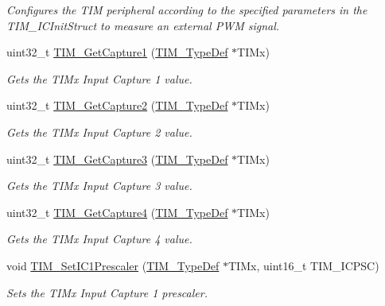 \begin{DoxyCompactItemize}
\begin{DoxyCompactList}\small\item\em Configures the T\+IM peripheral according to the specified parameters in the T\+I\+M\+\_\+\+I\+C\+Init\+Struct to measure an external P\+WM signal. \end{DoxyCompactList}\item 
uint32\+\_\+t \hyperlink{group___t_i_m_ga6bd39ca543305ff0cd06fce0f678d94d}{T\+I\+M\+\_\+\+Get\+Capture1} (\hyperlink{struct_t_i_m___type_def}{T\+I\+M\+\_\+\+Type\+Def} $\ast$T\+I\+Mx)
\begin{DoxyCompactList}\small\item\em Gets the T\+I\+Mx Input Capture 1 value. \end{DoxyCompactList}\item 
uint32\+\_\+t \hyperlink{group___t_i_m_ga2524cb5db14e388fb7f20c99fb3d58a5}{T\+I\+M\+\_\+\+Get\+Capture2} (\hyperlink{struct_t_i_m___type_def}{T\+I\+M\+\_\+\+Type\+Def} $\ast$T\+I\+Mx)
\begin{DoxyCompactList}\small\item\em Gets the T\+I\+Mx Input Capture 2 value. \end{DoxyCompactList}\item 
uint32\+\_\+t \hyperlink{group___t_i_m_ga71ee9ce2c535ec0fb3fac5f9119221f7}{T\+I\+M\+\_\+\+Get\+Capture3} (\hyperlink{struct_t_i_m___type_def}{T\+I\+M\+\_\+\+Type\+Def} $\ast$T\+I\+Mx)
\begin{DoxyCompactList}\small\item\em Gets the T\+I\+Mx Input Capture 3 value. \end{DoxyCompactList}\item 
uint32\+\_\+t \hyperlink{group___t_i_m_ga420b022cbc71ac603b5dd4922687abb1}{T\+I\+M\+\_\+\+Get\+Capture4} (\hyperlink{struct_t_i_m___type_def}{T\+I\+M\+\_\+\+Type\+Def} $\ast$T\+I\+Mx)
\begin{DoxyCompactList}\small\item\em Gets the T\+I\+Mx Input Capture 4 value. \end{DoxyCompactList}\item 
void \hyperlink{group___t_i_m_gaf0f684dea88e222de9689d8ed0ca8805}{T\+I\+M\+\_\+\+Set\+I\+C1\+Prescaler} (\hyperlink{struct_t_i_m___type_def}{T\+I\+M\+\_\+\+Type\+Def} $\ast$T\+I\+Mx, uint16\+\_\+t T\+I\+M\+\_\+\+I\+C\+P\+SC)
\begin{DoxyCompactList}\small\item\em Sets the T\+I\+Mx Input Capture 1 prescaler. \end{DoxyCompactList}\item 

\end{DoxyCompactItemize}
